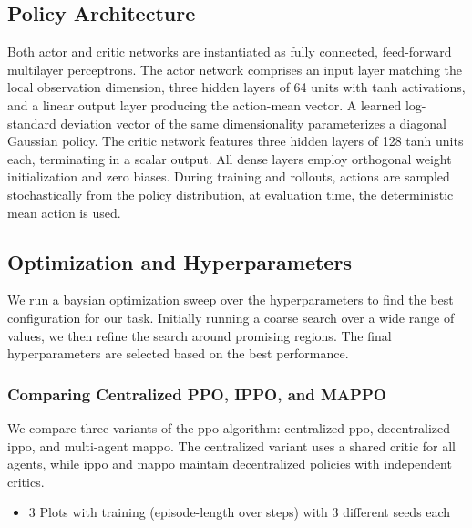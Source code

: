 \subsection{Policy Architecture}
Both actor and critic networks are instantiated as fully connected, feed-forward multilayer perceptrons. The actor network comprises an input layer matching the local observation dimension, three hidden layers of 64 units with tanh activations, and a linear output layer producing the action-mean vector. A learned log-standard deviation vector of the same dimensionality parameterizes a diagonal Gaussian policy. The critic network features three hidden layers of 128 tanh units each, terminating in a scalar output. All dense layers employ orthogonal weight initialization and zero biases. During training and rollouts, actions are sampled stochastically from the policy distribution, at evaluation time, the deterministic mean action is used.

\subsection{Optimization and Hyperparameters}
We run a baysian optimization sweep over the hyperparameters to find the best configuration for our task. Initially running a coarse search over a wide range of values, we then refine the search around promising regions. The final hyperparameters are selected based on the best performance.

\subsubsection{Comparing Centralized PPO, IPPO, and MAPPO}
We compare three variants of the \gls{ppo} algorithm: centralized \gls{ppo}, decentralized \gls{ippo}, and multi-agent \gls{mappo}. The centralized variant uses a shared critic for all agents, while \gls{ippo} and \gls{mappo} maintain decentralized policies with independent critics. 
\begin{itemize}
    \item 3 Plots with training (episode-length over steps) with 3 different seeds each
\end{itemize}


